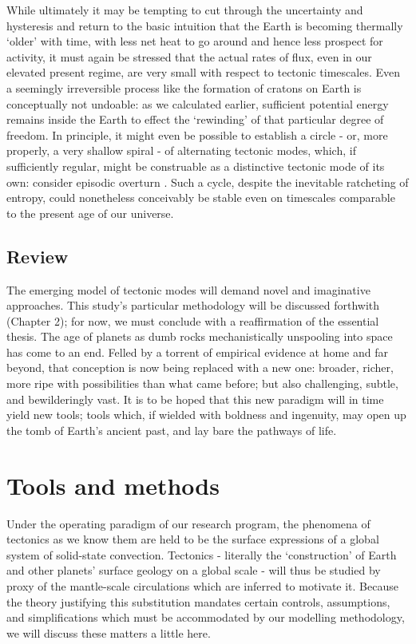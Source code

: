 \documentclass[a4paper,11pt,oneside]{book}
\begin{document}
While ultimately it may be tempting to cut through the uncertainty and hysteresis and return to the basic intuition that the Earth is becoming thermally `older' with time, with less net heat to go around and hence less prospect for activity, it must again be stressed that the actual rates of flux, even in our elevated present regime, are very small with respect to tectonic timescales. Even a seemingly irreversible process like the formation of cratons on Earth is conceptually not undoable: as we calculated earlier, sufficient potential energy remains inside the Earth to effect the `rewinding' of that particular degree of freedom. In principle, it might even be possible to establish a circle - or, more properly, a very shallow spiral - of alternating tectonic modes, which, if sufficiently regular, might be construable as a distinctive tectonic mode of its own: consider episodic overturn \cite{Moresi1998-az}. Such a cycle, despite the inevitable ratcheting of entropy, could nonetheless conceivably be stable even on timescales comparable to the present age of our universe.

\subsection{Review}

The emerging model of tectonic modes will demand novel and imaginative approaches. This study's particular methodology will be discussed forthwith (Chapter 2); for now, we must conclude with a reaffirmation of the essential thesis. The age of planets as dumb rocks mechanistically unspooling into space has come to an end. Felled by a torrent of empirical evidence at home and far beyond, that conception is now being replaced with a new one: broader, richer, more ripe with possibilities than what came before; but also challenging, subtle, and bewilderingly vast. It is to be hoped that this new paradigm will in time yield new tools; tools which, if wielded with boldness and ingenuity, may open up the tomb of Earth's ancient past, and lay bare the pathways of life.

\section{Tools and methods}

Under the operating paradigm of our research program, the phenomena of tectonics as we know them are held to be the surface expressions of a global system of solid-state convection. Tectonics - literally the `construction' of Earth and other planets' surface geology on a global scale - will thus be studied by proxy of the mantle-scale circulations which are inferred to motivate it. Because the theory justifying this substitution mandates certain controls, assumptions, and simplifications which must be accommodated by our modelling methodology, we will discuss these matters a little here.
\end{document}
